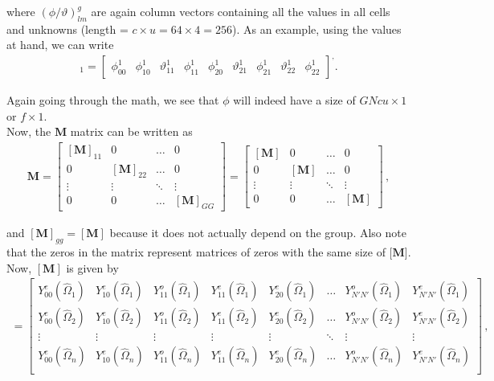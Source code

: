 \documentclass[10pt]{article}
\begin{document}
where $(\phi/\vartheta)_{lm}^g$ are again column vectors containing all the values in all cells and unknowns (length = $c \times u = 64 \times 4 = 256$). As an example, using the values at hand, we can write
%
\begin{align*}
[\phi]_1 =
\begin{bmatrix}
    \phi_{00}^1 & \phi_{10}^1 & \vartheta_{11}^1 & \phi_{11}^1 & \phi_{20}^1 & \vartheta_{21}^1 & \phi_{21}^1 & \vartheta_{22}^1 & \phi_{22}^1
\end{bmatrix} ^ ,.
\end{align*}

Again going through the math, we see that $\phi$ will indeed have a size of $GNcu \times 1$ or $f \times 1$.\\

Now, the $\textbf{M}$ matrix can be written as
%
\begin{align*}
\textbf{M} = 
\begin{bmatrix}
    [\textbf{M}]_{11} & 0 & \dots & 0  \\
    0 & [\textbf{M}]_{22} & \dots & 0  \\
    \vdots & \vdots & \ddots & \vdots \\
    0 & 0 & \dots & [\textbf{M}]_{GG}
\end{bmatrix}
=
\begin{bmatrix}
    [\textbf{M}] & 0 & \dots & 0  \\
    0 & [\textbf{M}] & \dots & 0  \\
    \vdots & \vdots & \ddots & \vdots \\
    0 & 0 & \dots & [\textbf{M}]
\end{bmatrix}\,,
\end{align*}

and $[\textbf{M}]_{gg} = [\textbf{M}]$ because it does not actually depend on the group. Also note that the zeros in the matrix represent matrices of zeros with the same size of [$\textbf{M}$]. Now, $[\textbf{M}]$ is given by
%
\begin{align*}
[\textbf{M}] = 
\begin{bmatrix}
   Y_{00}^e(\hat{\Omega}_1) & Y_{10}^e(\hat{\Omega}_1) & Y_{11}^o(\hat{\Omega}_1) & Y_{11}^e(\hat{\Omega}_1) & Y_{20}^e(\hat{\Omega}_1) & \dots & Y_{N'N'}^o(\hat{\Omega}_1) & Y_{N'N'}^e(\hat{\Omega}_1)  \\
      Y_{00}^e(\hat{\Omega}_2) & Y_{10}^e(\hat{\Omega}_2) & Y_{11}^o(\hat{\Omega}_2) & Y_{11}^e(\hat{\Omega}_2) & Y_{20}^e(\hat{\Omega}_2) & \dots & Y_{N'N'}^o(\hat{\Omega}_2) & Y_{N'N'}^e(\hat{\Omega}_2)  \\
      \vdots & \vdots & \vdots & \vdots & \vdots & \ddots &  \vdots & \vdots \\
         Y_{00}^e(\hat{\Omega}_n) & Y_{10}^e(\hat{\Omega}_n) & Y_{11}^o(\hat{\Omega}_n) & Y_{11}^e(\hat{\Omega}_n) & Y_{20}^e(\hat{\Omega}_n) & \dots & Y_{N'N'}^o(\hat{\Omega}_n) & Y_{N'N'}^e(\hat{\Omega}_n)  \\
\end{bmatrix}\,,
\end{align*}
\end{document}
